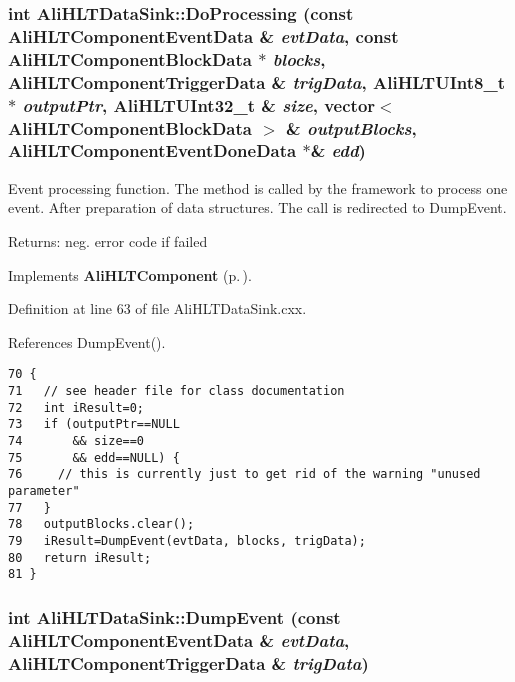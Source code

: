 \subsubsection{\setlength{\rightskip}{0pt plus 5cm}int Ali\-HLTData\-Sink::Do\-Processing (const {\bf Ali\-HLTComponent\-Event\-Data} \& {\em evt\-Data}, const {\bf Ali\-HLTComponent\-Block\-Data} $\ast$ {\em blocks}, {\bf Ali\-HLTComponent\-Trigger\-Data} \& {\em trig\-Data}, {\bf Ali\-HLTUInt8\_\-t} $\ast$ {\em output\-Ptr}, {\bf Ali\-HLTUInt32\_\-t} \& {\em size}, vector$<$ {\bf Ali\-HLTComponent\-Block\-Data} $>$ \& {\em output\-Blocks}, {\bf Ali\-HLTComponent\-Event\-Done\-Data} $\ast$\& {\em edd})\hspace{0.3cm}{\tt  [virtual]}}\label{classAliHLTDataSink_a2}


Event processing function. The method is called by the framework to process one event. After preparation of data structures. The call is redirected to Dump\-Event. \begin{Desc}
\item[Returns:]neg. error code if failed \end{Desc}


Implements {\bf Ali\-HLTComponent} {\rm (p.\,\pageref{classAliHLTComponent_a7})}.

Definition at line 63 of file Ali\-HLTData\-Sink.cxx.

References Dump\-Event().

\footnotesize\begin{verbatim}70 {
71   // see header file for class documentation
72   int iResult=0;
73   if (outputPtr==NULL
74       && size==0 
75       && edd==NULL) {
76     // this is currently just to get rid of the warning "unused parameter"
77   }
78   outputBlocks.clear();
79   iResult=DumpEvent(evtData, blocks, trigData);
80   return iResult;
81 }
\end{verbatim}\normalsize 


\subsubsection{\setlength{\rightskip}{0pt plus 5cm}int Ali\-HLTData\-Sink::Dump\-Event (const {\bf Ali\-HLTComponent\-Event\-Data} \& {\em evt\-Data}, {\bf Ali\-HLTComponent\-Trigger\-Data} \& {\em trig\-Data})\hspace{0.3cm}{\tt  [private, virtual]}}\label{classAliHLTDataSink_d1}


